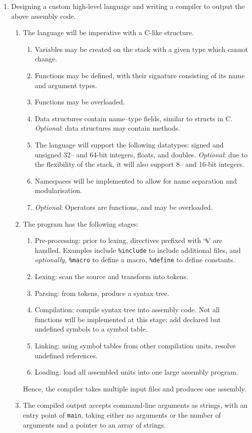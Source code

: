 \documentclass{article}
\begin{document}
\begin{enumerate}
        \item Designing a custom high-level language and writing a compiler to output the above assembly code.
        \begin{enumerate}
            \item The language will be imperative with a C-like structure.
            \begin{enumerate}
                \item Variables may be created on the stack with a given type which cannot change.
                \item Functions may be defined, with their signature consisting of its name and argument types.
                \item Functions may be overloaded.
                \item Data structures contain name--type fields, similar to structs in C.
                \textit{Optional}: data structures may contain methods.
                \item The language will support the following datatypes: signed and unsigned 32-- and 64-bit integers, floats, and doubles.
                \textit{Optional}: due to the flexibility of the stack, it will also support 8-- and 16-bit integers.
                \item Namespaces will be implemented to allow for name separation and modularisation.
                \item \textit{Optional}: Operators are functions, and may be overloaded.
            \end{enumerate}
            \item The program has the following stages:
            \begin{enumerate}
                \item Pre-processing: prior to lexing, directives prefixed with `\texttt{\%}' are handled.
                Examples include \texttt{\%include} to include additional files, and \textit{optionally}, \texttt{\%macro} to define a macro, \texttt{\%define} to define constants.
                \item Lexing: scan the source and transform into tokens.
                \item Parsing: from tokens, produce a syntax tree.
                \item Compilation: compile syntax tree into assembly code.
                Not all functions will be implemented at this stage; add declared but undefined symbols to a symbol table.
                \item Linking: using symbol tables from other compilation units, resolve undefined references.
                \item Loading: load all assembled units into one large assembly program.
            \end{enumerate}
            Hence, the compiler takes multiple input files and produces one assembly.
            \item The compiled output accepts command-line arguments as strings, with an entry point of \texttt{main}, taking either no arguments or the number of arguments and a pointer to an array of strings.
        \end{enumerate}


\end{enumerate}
\end{document}
